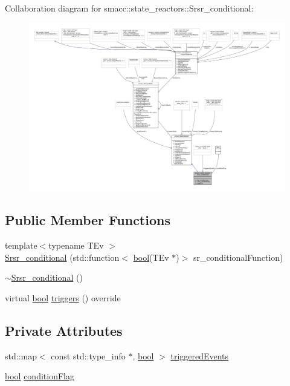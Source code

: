 Collaboration diagram for smacc\+:\+:state\+\_\+reactors\+:\+:Srsr\+\_\+conditional\+:
\nopagebreak
\begin{figure}[H]
\begin{center}
\leavevmode
\includegraphics[width=350pt]{classsmacc_1_1state__reactors_1_1Srsr__conditional__coll__graph}
\end{center}
\end{figure}
\subsection*{Public Member Functions}
\begin{DoxyCompactItemize}
\item 
{\footnotesize template$<$typename T\+Ev $>$ }\\\hyperlink{classsmacc_1_1state__reactors_1_1Srsr__conditional_a4f36ec873e26c4a8288f08f4d68924d3}{Srsr\+\_\+conditional} (std\+::function$<$ \hyperlink{classbool}{bool}(T\+Ev $\ast$)$>$ sr\+\_\+conditional\+Function)
\item 
\hyperlink{classsmacc_1_1state__reactors_1_1Srsr__conditional_a711473830935c7c4fb1d0939e41fb2cb}{$\sim$\+Srsr\+\_\+conditional} ()
\item 
virtual \hyperlink{classbool}{bool} \hyperlink{classsmacc_1_1state__reactors_1_1Srsr__conditional_aa95877afb569902015924e5e7d1da35a}{triggers} () override
\end{DoxyCompactItemize}
\subsection*{Private Attributes}
\begin{DoxyCompactItemize}
\item 
std\+::map$<$ const std\+::type\+\_\+info $\ast$, \hyperlink{classbool}{bool} $>$ \hyperlink{classsmacc_1_1state__reactors_1_1Srsr__conditional_ae2085e1ecd80a2d07e1c97ed6499b210}{triggered\+Events}
\item 
\hyperlink{classbool}{bool} \hyperlink{classsmacc_1_1state__reactors_1_1Srsr__conditional_a2c1c6a4acf1429526fe8c84e66479fbc}{condition\+Flag}
\end{DoxyCompactItemize}
